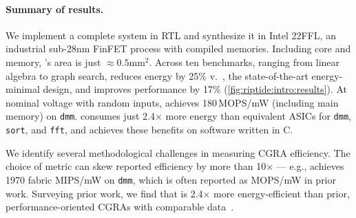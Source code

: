   

\figRipTideIntroResults
\paragraph{Summary of results.}
%
We implement a complete \riptide system in RTL and synthesize it in
Intel 22FFL, an industrial sub-28nm FinFET process with compiled memories.
%
Including core and memory, \riptide's area is just $\approx 0.5$mm$^2$.
%
Across ten benchmarks,
ranging from linear algebra to graph search, %
\riptide reduces energy by 25\% v.\ \snafu, the state-of-the-art energy-minimal design,
and improves performance by 17\% (\autoref{fig:riptide:intro:results}).
%
At nominal voltage with random inputs, \riptide achieves 180\,MOPS/mW (including main memory) on {\tt dmm}.
%
\riptide consumes just 2.4$\times$ more energy
than equivalent ASICs for {\tt dmm}, {\tt sort}, and {\tt fft},
%
and \riptide achieves these benefits on software written in C.

We identify several methodological challenges in measuring CGRA efficiency.
%
The choice of metric can skew reported efficiency by more than 10$\times$ ---
e.g., \riptide achieves 1970 fabric MIPS/mW on {\tt dmm},
which is often reported as MOPS/mW in prior work.
%
Surveying prior work,
%
we find that \riptide is 2.4$\times$ more energy-efficient than prior, performance-oriented CGRAs
with comparable data~\cite{wang2019hycube,torng2021ultra}.

